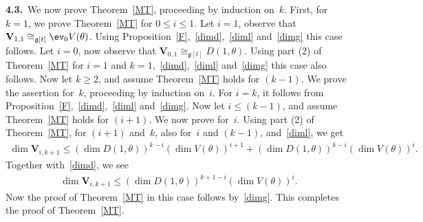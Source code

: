 {\bf 4.3.}~We now prove Theorem~\ref{MT}, proceeding by induction on~$k$.
First, for $k=1$, we prove Theorem~\ref{MT} for $0\leq i \leq 1$.
Let $i=1$, observe that $\mathbf{V}_{1,1} \cong_{\mathfrak{g}[t]} \ev_{0} V(\theta)$.
Using Proposition~\ref{F},~\eqref{dimd},~\eqref{diml} and~\eqref{dimg} this case follows.
Let $i=0$, now observe that $\mathbf{V}_{0,1} \cong_{\mathfrak{g}[t]} D(1,\theta)$.
Using part (2) of Theorem~\ref{MT} for $i=1$ and $k=1$,~\eqref{dimd},~\eqref{diml} and~\eqref{dimg} this case also
follows.
Now let $k\geq2$, and assume Theorem~\ref{MT} holds for $(k-1)$.
We prove the assertion for~$k$, proceeding by induction on~$i$.
For $i=k$, it follows from Proposition~\ref{F},~\eqref{dimd},~\eqref{diml} and~\eqref{dimg}.
Now let $i\leq (k-1)$, and assume Theorem~\ref{MT} holds for $(i+1)$.
We now prove for~$i$.
Using part (2) of Theorem~\ref{MT}, for $(i+1)$ and~$k$, also for~$i$ and $(k-1)$, and~\eqref{diml}, we get
\begin{gather*}
\dim \mathbf{V}_{i,k+1} \leq (\dim D(1, \theta))^{k-i} (\dim V(\theta))^{i+1} + (\dim D(1, \theta))^{k-i}
(\dim V(\theta))^{i}.
\end{gather*}
Together with~\eqref{dimd}, we see
\begin{gather*}
\dim \mathbf{V}_{i,k+1} \leq (\dim D(1,\theta))^{k+1-i} (\dim V(\theta))^{i}.
\end{gather*}
Now the proof of Theorem~\ref{MT} in this case follows by~\eqref{dimg}.
This completes the proof of Theorem~\ref{MT}.
